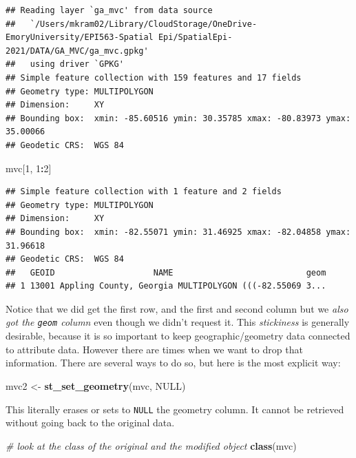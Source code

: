 \documentclass[
]{book}
\newenvironment{Shaded}{\begin{snugshade}}{\end{snugshade}}
\newcommand{\CommentTok}[1]{\textcolor[rgb]{0.56,0.35,0.01}{\textit{#1}}}
\newcommand{\ConstantTok}[1]{\textcolor[rgb]{0.56,0.35,0.01}{#1}}
\newcommand{\DecValTok}[1]{\textcolor[rgb]{0.00,0.00,0.81}{#1}}
\newcommand{\FunctionTok}[1]{\textcolor[rgb]{0.13,0.29,0.53}{\textbf{#1}}}
\newcommand{\NormalTok}[1]{#1}
\newcommand{\OtherTok}[1]{\textcolor[rgb]{0.56,0.35,0.01}{#1}}
\newcommand{\SpecialCharTok}[1]{\textcolor[rgb]{0.81,0.36,0.00}{\textbf{#1}}}
\begin{document}
\begin{verbatim}
## Reading layer `ga_mvc' from data source 
##   `/Users/mkram02/Library/CloudStorage/OneDrive-EmoryUniversity/EPI563-Spatial Epi/SpatialEpi-2021/DATA/GA_MVC/ga_mvc.gpkg' 
##   using driver `GPKG'
## Simple feature collection with 159 features and 17 fields
## Geometry type: MULTIPOLYGON
## Dimension:     XY
## Bounding box:  xmin: -85.60516 ymin: 30.35785 xmax: -80.83973 ymax: 35.00066
## Geodetic CRS:  WGS 84
\end{verbatim}

\begin{Shaded}
\begin{Highlighting}[]
\NormalTok{mvc[}\DecValTok{1}\NormalTok{, }\DecValTok{1}\SpecialCharTok{:}\DecValTok{2}\NormalTok{]}
\end{Highlighting}
\end{Shaded}

\begin{verbatim}
## Simple feature collection with 1 feature and 2 fields
## Geometry type: MULTIPOLYGON
## Dimension:     XY
## Bounding box:  xmin: -82.55071 ymin: 31.46925 xmax: -82.04858 ymax: 31.96618
## Geodetic CRS:  WGS 84
##   GEOID                    NAME                           geom
## 1 13001 Appling County, Georgia MULTIPOLYGON (((-82.55069 3...
\end{verbatim}

Notice that we did get the first row, and the first and second column but we \emph{also got the \texttt{geom} column} even though we didn't request it. This \emph{stickiness} is generally desirable, because it is so important to keep geographic/geometry data connected to attribute data. However there are times when we want to drop that information. There are several ways to do so, but here is the most explicit way:

\begin{Shaded}
\begin{Highlighting}[]
\NormalTok{mvc2 }\OtherTok{\textless{}{-}} \FunctionTok{st\_set\_geometry}\NormalTok{(mvc, }\ConstantTok{NULL}\NormalTok{)}
\end{Highlighting}
\end{Shaded}

This literally erases or sets to \texttt{NULL} the geometry column. It cannot be retrieved without going back to the original data.

\begin{Shaded}
\begin{Highlighting}[]
\CommentTok{\# look at the class of the original and the modified object}
\FunctionTok{class}\NormalTok{(mvc)}
\end{Highlighting}
\end{Shaded}
\end{document}
